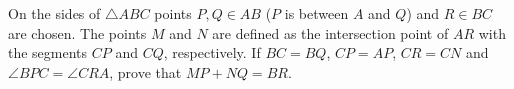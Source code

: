 On the sides of $\triangle{ABC}$ points $P,Q \in{AB}$ ($P$ is between $A$ and $Q$) and $R\in{BC}$ are chosen. The points $M$ and $N$ are defined as the intersection point of $AR$ with the segments $CP$ and $CQ$, respectively. If $BC=BQ$, $CP=AP$, $CR=CN$ and $\angle{BPC}=\angle{CRA}$, prove that $MP+NQ=BR$.